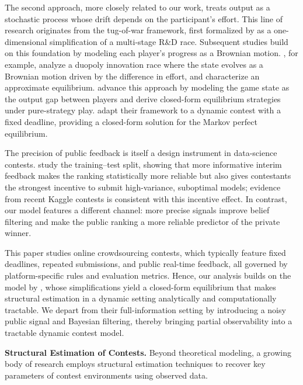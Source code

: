 \documentclass[mnsc]{informs3}
\begin{document}
The second approach, more closely related to our work, treats output as a stochastic process whose drift depends on the participant’s effort.
This line of research originates from the tug-of-war framework, first formalized by \citet{Harris1987Race} as a one-dimensional simplification of a multi-stage R\&D race.
Subsequent studies build on this foundation by modeling each player’s progress as a Brownian motion.
\citet{budd1993Duopoly}, for example, analyze a duopoly innovation race where the state evolves as a Brownian motion driven by the difference in effort, and characterize an approximate equilibrium.
\citet{Moscarini2007Contest} advance this approach by modeling the game state as the output gap between players and derive closed-form equilibrium strategies under pure-strategy play.
\citet{Ryvkin2022Fight} adapt their framework to a dynamic contest with a fixed deadline, providing a closed-form solution for the Markov perfect equilibrium.

The precision of public feedback is itself a design instrument in data-science contests. 
\citet{huang_2024_designing} study the training–test split, showing that more informative interim feedback makes the ranking statistically more reliable but also gives contestants the strongest incentive to submit high-variance, suboptimal models; 
evidence from recent Kaggle contests is consistent with this incentive effect. 
In contrast, our model features a different channel: more precise signals improve belief filtering and make the public ranking a more reliable predictor of the private winner.


This paper studies online crowdsourcing contests, which typically feature fixed deadlines, repeated submissions, and public real-time feedback, all governed by platform-specific rules and evaluation metrics.
Hence, our analysis builds on the model by \citet{Ryvkin2022Fight}, whose simplifications yield a closed-form equilibrium that makes structural estimation in a dynamic setting analytically and computationally tractable.
We depart from their full-information setting by introducing a noisy public signal and Bayesian filtering, thereby bringing partial observability into a tractable dynamic contest model.



\textbf{Structural Estimation of Contests.}
Beyond theoretical modeling, a growing body of research employs structural estimation techniques to recover key parameters of contest environments using observed data.
\end{document}
